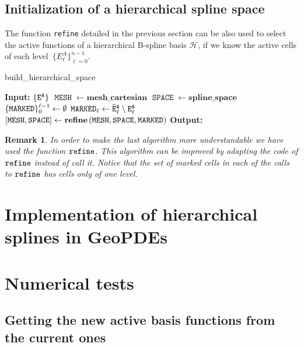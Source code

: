 \documentclass[a4paper]{siamltex1213}
\newtheorem{remark}[theorem]{Remark}
\newcommand{\activeelements}[1]{\tt E^A_{#1}}
\DeclareMathOperator\mesh{\texttt{MESH}}
\DeclareMathOperator\basis{\texttt{SPACE}}
\DeclareMathOperator\marked{\tt MARKED}
\newcommand\HH{\mathcal H}
\let\hat\widehat
\begin{document}
\subsection{Initialization of a hierarchical spline space}

The function \texttt{refine} detailed in the previous section can be also used to select the active functions of a hierarchical B-spline basis $\HH$, if we know the active cells of each level~$\{E^A_\ell\}_{\ell=0}^{n-1}$. 

\begin{algorithm}
\caption{build\_hierarchical\_space}
\begin{algorithmic}[1]
\Statex \textbf{Input:} $\{\activeelements{ }\}$
\State $\mesh \gets \textbf{mesh\_cartesian}$  
\State $\basis \gets \textbf{spline\_space}$  
  \State $\{\marked\}_0^{\ell-1} \gets \emptyset$
  \State $\marked_\ell \gets \tt{\hat E^A_\ell} \setminus \activeelements{\ell}$
  \State $[\mesh, \basis] \gets \textbf{refine} \, (\mesh, \basis, \marked)$
\EndFor
\Statex \textbf{Output:}
\end{algorithmic}
\end{algorithm}

\begin{remark}
 In order to make the last algorithm more understandable we have used the function $\verb+refine+$. This algorithm can be improved by adapting the code of $\verb+refine+$ instead of call it. Notice that the set of marked cells in each of the calls to $\verb+refine+$ has cells only of one level. 
\end{remark}

\section{Implementation of hierarchical splines in GeoPDEs} \label{sec:geopdes}

\section{Numerical tests}\label{sec:tests}

\subsection{Getting the new active basis functions from the current ones}
 


\end{document}
